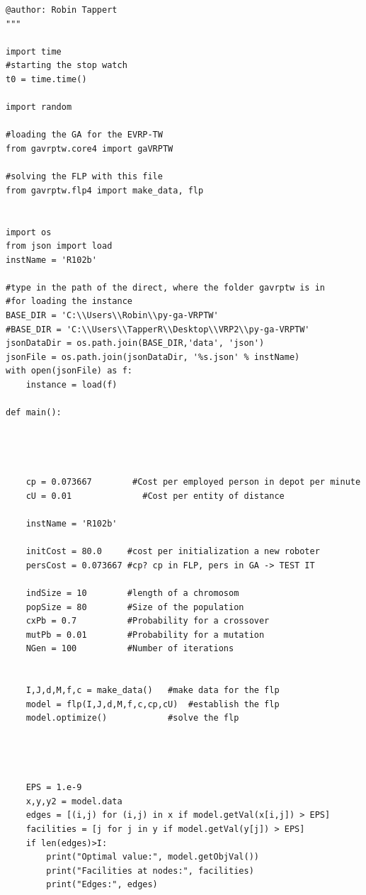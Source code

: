 \documentclass[a4paper,12pt,parskip,bibtotoc,liststotoc]{article}
\begin{document}
\begin{appendix}
\begin{lstlisting}
@author: Robin Tappert
"""

import time
#starting the stop watch
t0 = time.time()

import random

#loading the GA for the EVRP-TW
from gavrptw.core4 import gaVRPTW

#solving the FLP with this file
from gavrptw.flp4 import make_data, flp


import os
from json import load
instName = 'R102b'

#type in the path of the direct, where the folder gavrptw is in
#for loading the instance
BASE_DIR = 'C:\\Users\\Robin\\py-ga-VRPTW'
#BASE_DIR = 'C:\\Users\\TapperR\\Desktop\\VRP2\\py-ga-VRPTW'
jsonDataDir = os.path.join(BASE_DIR,'data', 'json')
jsonFile = os.path.join(jsonDataDir, '%s.json' % instName)
with open(jsonFile) as f:
    instance = load(f)

def main():

    
    
    
    cp = 0.073667        #Cost per employed person in depot per minute
    cU = 0.01              #Cost per entity of distance 
        
    instName = 'R102b'
    
    initCost = 80.0     #cost per initialization a new roboter
    persCost = 0.073667 #cp? cp in FLP, pers in GA -> TEST IT
    
    indSize = 10        #length of a chromosom
    popSize = 80        #Size of the population
    cxPb = 0.7          #Probability for a crossover
    mutPb = 0.01        #Probability for a mutation
    NGen = 100          #Number of iterations 
    
    
    I,J,d,M,f,c = make_data()   #make data for the flp
    model = flp(I,J,d,M,f,c,cp,cU)  #establish the flp
    model.optimize()            #solve the flp
    
    
    
    
    EPS = 1.e-9
    x,y,y2 = model.data
    edges = [(i,j) for (i,j) in x if model.getVal(x[i,j]) > EPS]
    facilities = [j for j in y if model.getVal(y[j]) > EPS]
    if len(edges)>I:
        print("Optimal value:", model.getObjVal())
        print("Facilities at nodes:", facilities)
        print("Edges:", edges)
        

\end{lstlisting}
\end{appendix}
\end{document}

